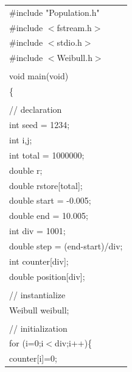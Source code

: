 {\footnotesize
\begin{center}
\begin{tabular}{|l|}\hline
\#include "Population.h"\\
\#include $<$fstream.h$>$\\
\#include $<$stdio.h$>$\\
\#include $<$Weibull.h$>$\\
\hspace*{\textwidth}\\
void main(void)\\
\{\\
\\
\hspace*{10mm}// declaration\\
\hspace*{10mm}int seed      = 1234;\\
\hspace*{10mm}int i,j;\\
\hspace*{10mm}int total     = 1000000;\\
\hspace*{10mm}double r;\\
\hspace*{10mm}double rstore[total];\\
\hspace*{10mm}double start  = -0.005;\\
\hspace*{10mm}double end    = 10.005;\\
\hspace*{10mm}int div       = 1001;\\
\hspace*{10mm}double step   = (end-start)/div;\\
\hspace*{10mm}int counter[div];\\
\hspace*{10mm}double position[div];\\
\\
\hspace*{10mm}// instantialize\\
\hspace*{10mm}Weibull weibull;\\
\\
\hspace*{10mm}// initialization\\
\hspace*{10mm}for (i=0;i$<$div;i++)\{\\
\hspace*{20mm}counter[i]=0;\\

\end{tabular}
\end{center}}

